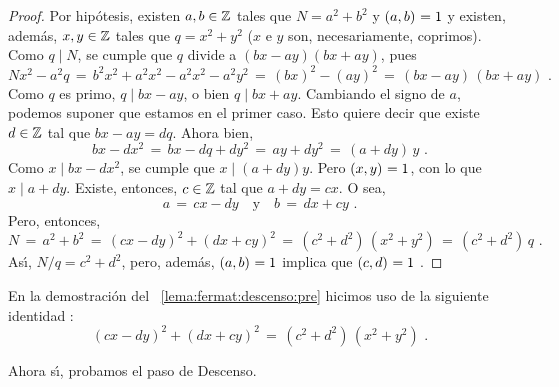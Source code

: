 \begin{proof}
	Por hip\'otesis, existen $a,b\in\mathbb{Z}$ tales que $N=a^2+b^2$ y
	$\left({a,b}\right)_{}=1$ y existen, adem\'as, $x,y\in\mathbb{Z}$ tales que
	$q=x^2+y^2$ ($x$ e $y$ son, necesariamente, coprimos).
	Como $q\mid N$, se cumple que $q$ divide a $(bx-ay)(bx+ay)$, pues
	\begin{displaymath}
		Nx^2-a^2q\,=\,
		b^2x^2+a^2x^2-a^2x^2-a^2y^2\,=\,(bx)^2-(ay)^2\,=\,
		(bx-ay)\,(bx+ay)
		\text{ .}
	\end{displaymath}
	Como $q$ es primo, $q\mid bx-ay$, o bien $q\mid bx+ay$.
	Cambiando el signo de $a$, podemos suponer que estamos en el primer
	caso. Esto quiere decir que existe $d\in\mathbb{Z}$ tal que
	\begin{math}
		bx-ay=dq
	\end{math}.
	Ahora bien,
	\begin{displaymath}
		bx-dx^2\,=\,
		bx-dq+dy^2\,=\,ay+dy^2\,=\,
		(a+dy)\,y
		\text{ .}
	\end{displaymath}
	Como $x\mid bx-dx^2$, se cumple que $x\mid (a+dy)y$. Pero
	$\left({x,y}\right)_{}=1$, con lo que $x\mid a+dy$. Existe, entonces,
	$c\in\mathbb{Z}$ tal que
	\begin{math}
		a+dy=cx
	\end{math}.
	O sea,
	\begin{displaymath}
		a \,=\,cx-dy\quad\text{y}\quad b \,=\,dx+cy\text{ .}
	\end{displaymath}
	Pero, entonces,
	\begin{displaymath}
		N\,=\,a^2+b^2\,=\,
		(cx-dy)^2+(dx+cy)^2\,=\,(c^2+d^2)\,(x^2+y^2)\,=\,
		(c^2+d^2)\,q
		\text{ .}
	\end{displaymath}
	As\'{\i}, $N/q=c^2+d^2$, pero, adem\'as, $\left({a,b}\right)_{}=1$ implica
	que $\left({c,d}\right)_{}=1$
	\quedacomoejercicio.
\end{proof}

\begin{obsFermat}\label{obs:fermat:descenso}
	En la demostraci\'on del \lemaname~\ref{lema:fermat:descenso:pre}
	hicimos uso de la siguiente identidad \quedacomoejercicio:
	\begin{equation}
		\label{eq:fermat:descenso:identidad}
		(cx-dy)^2+(dx+cy)^2\,=\,(c^2+d^2)\,(x^2+y^2)
		\text{ .}
	\end{equation}
\end{obsFermat}

Ahora s\'{\i}, probamos el paso de Descenso.

